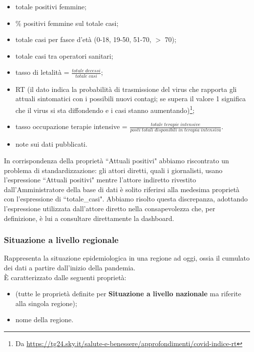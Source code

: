 \begin{itemize}
    \item totale positivi femmine;
    \item \% positivi femmine sul totale casi;
    \item totale casi per fasce d'età (0-18, 19-50, 51-70, $>$ 70);
    \item totale casi tra operatori sanitari;
    \item tasso di letalità = $\frac{totale \; decessi}{totale \; casi}$;
    \item RT (il dato indica la probabilità di trasmissione del virus che rapporta gli attuali sintomatici con i possibili nuovi contagi; se supera il valore 1 significa che il virus si sta diffondendo e i casi stanno aumentando)\footnote{Da \href{https://tg24.sky.it/salute-e-benessere/approfondimenti/covid-indice-rt}{https://tg24.sky.it/salute-e-benessere/approfondimenti/covid-indice-rt}};
    \item tasso occupazione terapie intensive = $\frac{totale \; terapie \; intensive}{posti \; totali \; disponibili \; in \; terapia \; intensiva}$.
    \item note sui dati pubblicati.
\end{itemize}
In corrispondenza della proprietà ``Attuali positivi" abbiamo riscontrato un problema di standardizzazione: gli attori diretti, quali i giornalisti, usano l'espressione ``Attuali positivi" mentre l'attore indiretto rivestito dall'Amministratore della base di dati è solito riferirsi alla medesima proprietà con l'espressione di ``totale\_casi". Abbiamo risolto questa discrepanza, adottando l'espressione utilizzata dall'attore diretto nella consapevolezza che, per definizione, è lui a consultare direttamente la dashboard.

\subsubsection{Situazione a livello regionale}
\label{sss:situazione-livello-regionale}
Rappresenta la situazione epidemiologica in una regione ad oggi, ossia il cumulato dei dati a partire dall'inizio della pandemia.\\
È caratterizzato dalle seguenti proprietà:
\begin{itemize}
    \item (tutte le proprietà definite per \textbf{Situazione a livello nazionale} ma riferite alla singola regione);
    \item nome della regione.
\end{itemize}

